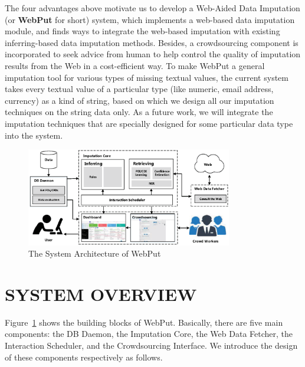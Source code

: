 \documentclass[sigconf]{acmart}
\begin{document}
The four advantages above motivate us to develop a Web-Aided Data Imputation (or {\bf WebPut} for short) system, which implements a web-based data imputation module, and finds ways to integrate the web-based imputation with existing inferring-based data imputation methods. Besides, a crowdsourcing component is incorporated to seek advice from human to help control the quality of imputation results from the Web in a cost-efficient way.
%
To make WebPut a general imputation tool for various types of missing textual values, the current system takes every textual value of a particular type (like numeric, email address, currency) as a kind of string, based on which we design all our imputation techniques on the string data only. As a future work, we will integrate the imputation techniques that are specially designed for some particular data type into the system.
%

\begin{figure}
  \centerline{\includegraphics[width=9cm]{images/Architecture.eps}}
  \caption{The System Architecture of WebPut}
  \label{fig:architecture}
\end{figure}


\section{SYSTEM  OVERVIEW}
Figure~\ref{fig:architecture} shows the building blocks of WebPut. Basically, there are  five main components: the DB Daemon, the Imputation Core, the Web Data Fetcher, the Interaction Scheduler, and the Crowdsourcing Interface. We introduce the design of these components respectively as follows.
\end{document}
